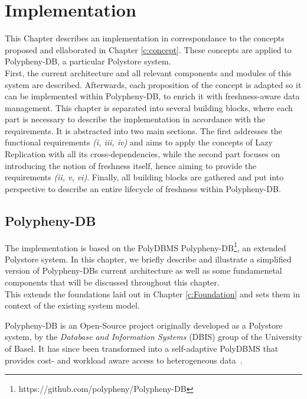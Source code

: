 \chapter{Implementation}
\label{c:implementation}

This Chapter describes an implementation in correspondance to the concepts proposed and ellaborated in Chapter \ref{c:concept}. 
These concepts are applied to Polypheny-DB, a particular Polystore system.\\
First, the current architecture and all relevant components and modules of this system are described. Afterwards, each proposition of the concept is adapted
so it can be implemented within Polypheny-DB, to enrich it with freshness-aware data management.
This chapter is separated into several building blocks, where each part is necessary to describe the implementation in accordance with the requirements.
It is abstracted into two main sections. The first addresses the functional requirements \textit{(i, iii, iv)} and aims to apply the concepts of Lazy Replication with all its
cross-dependencies, while the second part focuses on introducing the notion of freshness itself, hence aiming to provide the requirements \textit{(ii, v, vi)}.
Finally, all building blocks are gathered and put into perspective to describe an entire lifecycle of freshness within Polypheny-DB. 





\section{Polypheny-DB}
\label{sec:architecture}


The implementation is based on the PolyDBMS Polypheny-DB\footnote{https://github.com/polypheny/Polypheny-DB}, an extended Polystore system.
In this chapter, we briefly describe and illustrate a simplified version of Polypheny-DBs current architecture
as well as some fundamenetal components that will be discussed throughout this chapter.\\
This extends the foundations laid out in Chapter \ref{c:Foundation} and sets them in context of the existing system model.




Polypheny-DB is an Open-Source project originally developed as a Polystore system, by 
the \textit{Database and Information Systems} (DBIS) group of the University of Basel.
It has since been transformed into a self-adaptive PolyDBMS that provides cost- and workload aware access to heterogeneous data~\cite{poly2020}.

